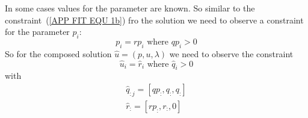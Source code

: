 In some cases values for the parameter are known. So similar to the constraint~(\ref{APP FIT EQU 1b}) fro the solution
we need to observe a constraint for the parameter $p_i$:
\begin{equation} \label{APP FIT EQU 12a}
p_i=rp_i \mbox{ where } qp_i>0
\end{equation}
So for the composed solution $\widehat{u} = (p,u,\lambda)$ we need to observe the constraint
\begin{equation} \label{APP FIT EQU 12b}
\widehat{u}_i=\widehat{r}_i \mbox{ where } \widehat{q}_i>0
\end{equation}
with 
\begin{align}\label{APP FIT EQU 12c}
\widehat{q}_{:j} = \left[ qp_{:}, q_{:}, q_{:} \right] \\
\widehat{r}_{:} = \left[ rp_{:}, r_{:}, 0\right] \\
\end{align}
